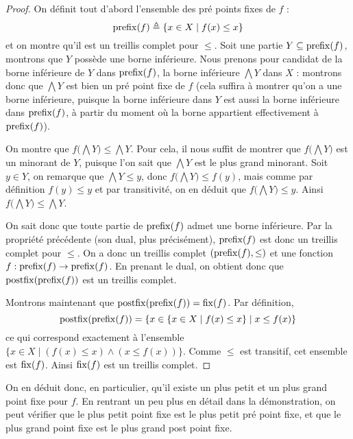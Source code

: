 \begin{proof}
  On définit tout d'abord l'ensemble des pré points fixes de $f$ :
  \[\operatorname{prefix}(f) \triangleq \{x\in X\mid f(x)\leq x\}\]
  et on montre qu'il est un treillis complet pour $\leq$. Soit une partie
  $Y\subseteq\operatorname{prefix}(f)$, montrons que $Y$ possède une borne inférieure. Nous
  prenons pour candidat de la borne inférieure de $Y$ dans $\operatorname{prefix}(f)$, la
  borne inférieure $\bigwedge Y$ dans $X$ : montrons donc que $\bigwedge Y$ est
  bien un pré point fixe de $f$ (cela suffira à montrer qu'on a une borne
  inférieure, puisque la borne inférieure dans $Y$ est aussi la borne inférieure
  dans $\operatorname{prefix}(f)$, à partir du moment où la borne appartient effectivement à
  $\operatorname{prefix}(f)$).

  On montre que $f\big(\bigwedge Y\big) \leq \bigwedge Y$. Pour cela, il nous
  suffit de montrer que $f\big(\bigwedge Y\big)$ est un minorant de $Y$, puisque
  l'on sait que $\bigwedge Y$ est le plus grand minorant. Soit $y\in Y$, on
  remarque que $\bigwedge Y \leq y$, donc $f\big(\bigwedge Y\big) \leq f(y)$,
  mais comme par définition $f(y)\leq y$ et par transitivité, on en déduit que
  $f\big(\bigwedge Y\big) \leq y$. Ainsi
  $f\big(\bigwedge Y\big) \leq \bigwedge Y$.

  On sait donc que toute partie de $\operatorname{prefix}(f)$ admet une borne inférieure. Par
  la propriété précédente (son dual, plus précisément), $\operatorname{prefix}(f)$ est donc
  un treillis complet pour $\leq$. On a donc un treillis complet
  $(\operatorname{prefix}(f),\leq)$ et une fonction $f : \operatorname{prefix}(f) \to\operatorname{prefix}(f)$. En prenant
  le dual, on obtient donc que $\operatorname{postfix}(\operatorname{prefix}(f))$ est un treillis complet.

  Montrons maintenant que $\operatorname{postfix}(\operatorname{prefix}(f)) = \operatorname{fix}(f)$. Par définition,
  \[\operatorname{postfix}(\operatorname{prefix}(f)) =
  \{x\in \{x\in X \mid f(x)\leq x\} \mid x \leq f(x)\}\]
  ce qui correspond exactement à l'ensemble
  $\{x\in X\mid (f(x) \leq x) \land (x \leq f(x))\}$. Comme $\leq$ est
  transitif, cet ensemble est $\operatorname{fix}(f)$. Ainsi $\operatorname{fix}(f)$ est un treillis
  complet.
\end{proof}

\begin{remark}
  On en déduit donc, en particulier, qu'il existe un plus petit et un plus grand
  point fixe pour $f$. En rentrant un peu plus en détail dans la démonstration,
  on peut vérifier que le plus petit point fixe est le plus petit pré point
  fixe, et que le plus grand point fixe est le plus grand post point fixe.
\end{remark}

